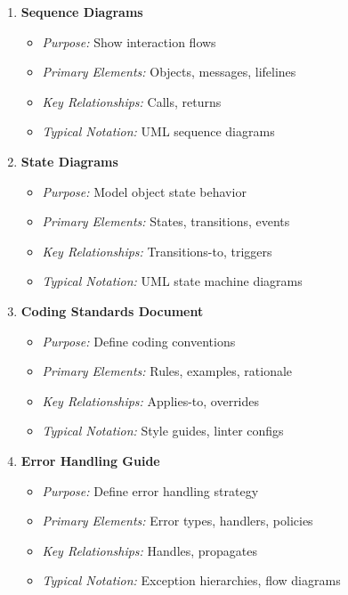 \documentclass[11pt,letterpaper]{article}
\begin{document}
\begin{enumerate}[label=\textbf{MT\arabic*:}, leftmargin=2.5em]
    \item \textbf{Sequence Diagrams}
    \begin{itemize}[nosep]
        \item \textit{Purpose:} Show interaction flows
        \item \textit{Primary Elements:} Objects, messages, lifelines
        \item \textit{Key Relationships:} Calls, returns
        \item \textit{Typical Notation:} UML sequence diagrams
    \end{itemize}
    
    \item \textbf{State Diagrams}
    \begin{itemize}[nosep]
        \item \textit{Purpose:} Model object state behavior
        \item \textit{Primary Elements:} States, transitions, events
        \item \textit{Key Relationships:} Transitions-to, triggers
        \item \textit{Typical Notation:} UML state machine diagrams
    \end{itemize}
    
    \item \textbf{Coding Standards Document}
    \begin{itemize}[nosep]
        \item \textit{Purpose:} Define coding conventions
        \item \textit{Primary Elements:} Rules, examples, rationale
        \item \textit{Key Relationships:} Applies-to, overrides
        \item \textit{Typical Notation:} Style guides, linter configs
    \end{itemize}
    
    \item \textbf{Error Handling Guide}
    \begin{itemize}[nosep]
        \item \textit{Purpose:} Define error handling strategy
        \item \textit{Primary Elements:} Error types, handlers, policies
        \item \textit{Key Relationships:} Handles, propagates
        \item \textit{Typical Notation:} Exception hierarchies, flow diagrams
    \end{itemize}
    

\end{enumerate}
\end{document}
